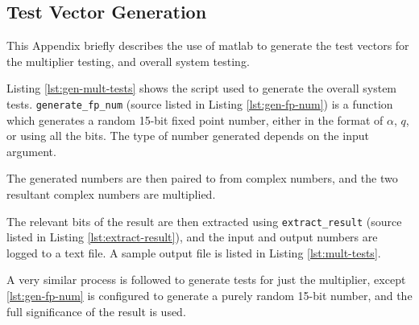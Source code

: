 \clearpage
\begin{appendices}

\section{ Test Vector Generation} \label{app:matlab-code}
This Appendix briefly describes the use of \gls{matlab} to generate the test vectors for the multiplier testing, and overall system testing.

Listing \ref{lst:gen-mult-tests} shows the script used to generate the overall system tests. \texttt{generate\_fp\_num} (source listed in Listing \ref{lst:gen-fp-num}) is a function which generates a random 15-bit fixed point number, either in the format of $\alpha$, $q$, or using all the bits. The type of number generated depends on the input argument.

The generated numbers are then paired to from complex numbers, and the two resultant complex numbers are multiplied.

The relevant bits of the result are then extracted using \texttt{extract\_result} (source listed in Listing \ref{lst:extract-result}), and the input and output numbers are logged to a text file. A sample output file is listed in Listing \ref{lst:mult-tests}.

A very similar process is followed to generate tests for just the multiplier, except \ref{lst:gen-fp-num} is configured to generate a purely random 15-bit number, and the full significance of the result is used.










\end{appendices}